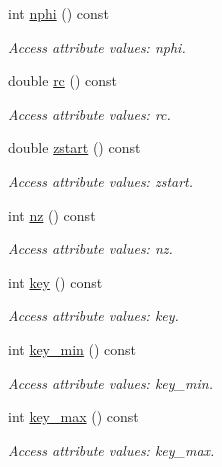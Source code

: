 \begin{DoxyCompactItemize}
int \hyperlink{struct_d_d4hep_1_1_x_m_l_1_1_dimension_a37f4a14b3e7965d2f4b3ddefa871141a}{nphi} () const 
\begin{DoxyCompactList}\small\item\em Access attribute values: nphi. \item\end{DoxyCompactList}\item 
double \hyperlink{struct_d_d4hep_1_1_x_m_l_1_1_dimension_aba7e86be01f95779fca80cfc373e7b3c}{rc} () const 
\begin{DoxyCompactList}\small\item\em Access attribute values: rc. \item\end{DoxyCompactList}\item 
double \hyperlink{struct_d_d4hep_1_1_x_m_l_1_1_dimension_a0ed6fe74c9beeb7f1e5e856505917b31}{zstart} () const 
\begin{DoxyCompactList}\small\item\em Access attribute values: zstart. \item\end{DoxyCompactList}\item 
int \hyperlink{struct_d_d4hep_1_1_x_m_l_1_1_dimension_a71eaee080c5418821a5facda328ac88f}{nz} () const 
\begin{DoxyCompactList}\small\item\em Access attribute values: nz. \item\end{DoxyCompactList}\item 
int \hyperlink{struct_d_d4hep_1_1_x_m_l_1_1_dimension_a1bf67b433bddb96f1e550a45c513d727}{key} () const 
\begin{DoxyCompactList}\small\item\em Access attribute values: key. \item\end{DoxyCompactList}\item 
int \hyperlink{struct_d_d4hep_1_1_x_m_l_1_1_dimension_a42e2e46f78454fca108e5df678823b96}{key\_\-min} () const 
\begin{DoxyCompactList}\small\item\em Access attribute values: key\_\-min. \item\end{DoxyCompactList}\item 
int \hyperlink{struct_d_d4hep_1_1_x_m_l_1_1_dimension_a8e19f08463e37db22d911a8ee6092b30}{key\_\-max} () const 
\begin{DoxyCompactList}\small\item\em Access attribute values: key\_\-max. \item\end{DoxyCompactList}\item 

\end{DoxyCompactItemize}

